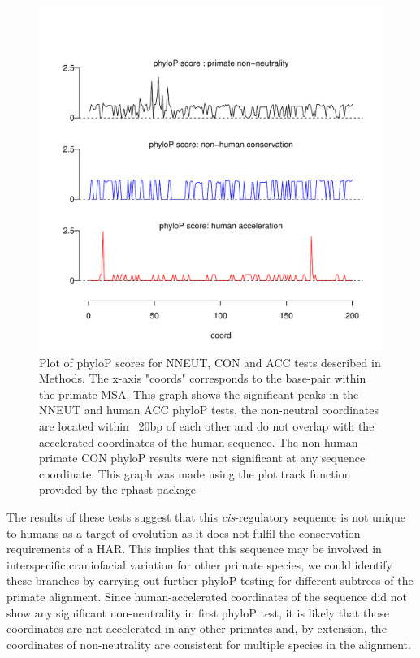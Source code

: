 \documentclass{article}[12pt]
\begin{document}
\begin{figure}[H]
\centering
\includegraphics[width=12cm]{compare_phyloP.pdf}
\caption{Plot of phyloP scores for NNEUT, CON and ACC tests described in Methods. The x-axis "coords" corresponds to the base-pair within the primate MSA. This graph shows the significant peaks in the NNEUT and human ACC phyloP tests, the non-neutral coordinates are located within ~20bp of each other and do not overlap with the accelerated coordinates of the human sequence. The non-human primate CON phyloP results were not significant at any sequence coordinate. This graph was made using the plot.track function provided by the rphast package \parencite{Rphast}}
\label{fig2}
\end{figure}

The results of these tests suggest that this \emph{cis}-regulatory sequence is not unique to humans as a target of evolution as it does not fulfil the conservation requirements of a \Gls{HAR}. This implies that this sequence may be involved in interspecific craniofacial variation for other primate species, we could identify these branches by carrying out further phyloP testing for different subtrees of the primate alignment. Since human-accelerated coordinates of the sequence did not show any significant non-neutrality in first phyloP test, it is likely that those coordinates are not accelerated in any other primates and, by extension, the coordinates of non-neutrality are consistent for multiple species in the alignment.
\end{document}
